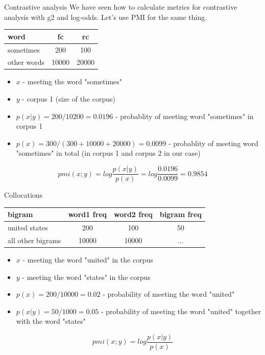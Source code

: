 \documentclass[svgnames]{beamer}
\begin{document}
\begin{frame}{Contrastive analysis}
  We have seen how to calculate metrics for contrastive analysis with g2 and log-odds. Let's use PMI for the same thing.
  \begin{tabular}[l]{lcc}
    word & fc & rc \\
    \hline
    sometimes & 200 & 100 \\
    other words & 10000 & 20000\\
  \end{tabular}

  \begin{itemize}
  \item $x$ - meeting the word "sometimes"
  \item $y$ - corpus 1 (size of the corpus)
  \item $p(x|y)= 200 / 10200 = 0.0196$ - probablity of meeting word "sometimes" in corpus 1
  \item $p(x)= 300 / (300+10000+20000) = 0.0099$ - probablity of meeting word "sometimes" in total (in corpus 1 and corpus 2 in our case)
  \end{itemize}
  
  $$pmi(x;y) = log \frac{p(x|y)}{p(x)} = log \frac{0.0196}{0.0099} = 0.9854$$
\end{frame}

\begin{frame}{Collocations}
  \begin{tabular}[l]{lccc}
    bigram & word1 freq & word2 freq & bigram freq \\
    \hline
    united states & 200 & 100 & 50\\
    all other bigrams & 10000 & 10000 & ...\\
  \end{tabular}
    \begin{itemize}
  \item $x$ - meeting the word "united" in the corpus
  \item $y$ - meeting the word "states" in the corpus
  \item $p(x)=200/10000 = 0.02$ - probability of meeting the word "united"
  \item $p(x|y) = 50/1000=0.05$ - probability of meeting the word "united" together with the word "states"
    \end{itemize}

  $$pmi(x;y) = log \frac{p(x|y)}{p(x)} $$

\end{frame}
\end{document}
